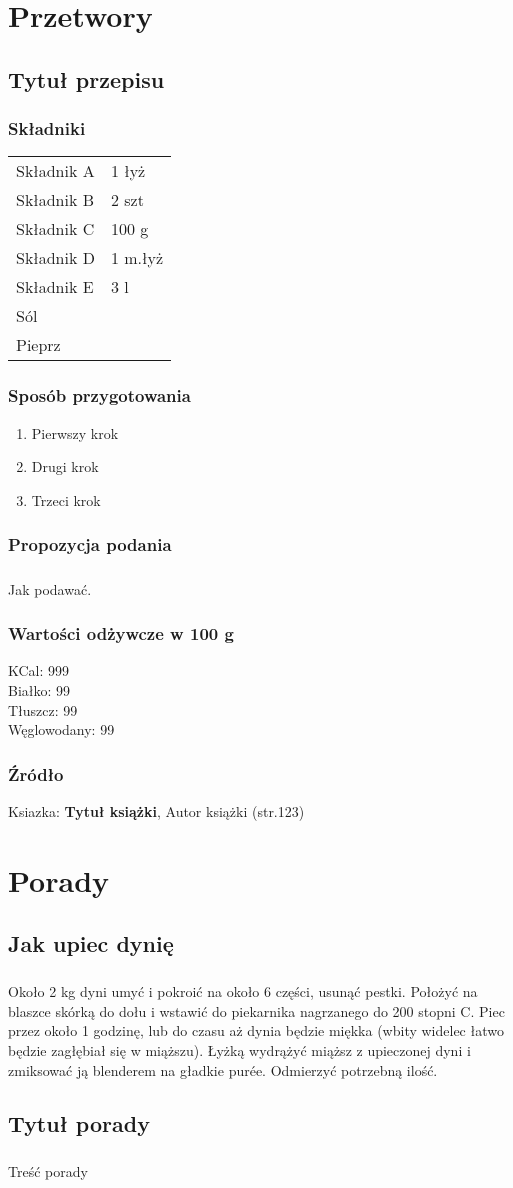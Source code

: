\documentclass{book}
\newcommand{\skladniki}[1]{\subsection*{Składniki}
	\begin{tabular}{ll}
		#1
	\end{tabular}
}
\newcommand{\skladnik}[3]{#3&#1 #2\\}
\newcommand{\sztuk}[2]{\skladnik{#1}{szt}{#2}}
\newcommand{\gram}[2]{\skladnik{#1}{g}{#2}}
\newcommand{\litr}[2]{\skladnik{#1}{l}{#2}}
\newcommand{\lyzka}[2]{\skladnik{#1}{łyż}{#2}}
\newcommand{\lyzeczka}[2]{\skladnik{#1}{m.łyż}{#2}}
\newcommand{\przyprawa}[1]{\skladnik{}{}{#1}}
\newcommand{\przygotowanie}[1]{\subsection*{Sposób przygotowania}
	\begin{enumerate}
		#1
	\end{enumerate}
}
\newcommand{\krok}[1]{\item #1}
\newcommand{\podanie}[1]{\subsection*{Propozycja podania}#1}
\newcommand{\wartosci}[4]{\subsection*{Wartości odżywcze w 100 g}
	KCal: #1\\
	Białko: #2\\
	Tłuszcz: #3\\
	Węglowodany: #4
}
\newcommand{\zrodlo}[1]{\subsection*{Źródło}#1}
\newcommand{\ksiazka}[3]{Ksiazka: \textbf{#1}, #2 (str.#3)}
\begin{document}
	\chapter{Przetwory}
		\newpage
	
		\section{Tytuł przepisu} %
			\skladniki{
				\lyzka{1}{Składnik A}
				\sztuk{2}{Składnik B}
				\gram{100}{Składnik C}
				\lyzeczka{1}{Składnik D}
				\litr{3}{Składnik E}
				\przyprawa{Sól}
				\przyprawa{Pieprz}
			}
			\przygotowanie{
				\krok{Pierwszy krok}
				\krok{Drugi krok}
				\krok{Trzeci krok}
			}
			\podanie{
				\paragraph{}Jak podawać.
			}
			\wartosci{999}{99}{99}{99}
			\zrodlo{\ksiazka{Tytuł książki}{Autor książki}{123}}
			\newpage
	
	\chapter{Porady}
		\newpage
	
		\section{Jak upiec dynię}
			\paragraph{}Około 2 kg dyni umyć i pokroić na około 6 części, usunąć pestki. Położyć na blaszce skórką do dołu i wstawić do piekarnika nagrzanego do 200 stopni C. Piec przez około 1 godzinę, lub do czasu aż dynia będzie miękka (wbity widelec łatwo będzie zagłębiał się w miąższu). Łyżką wydrążyć miąższ z upieczonej dyni i zmiksować ją blenderem na gładkie purée. Odmierzyć potrzebną ilość.
	
		\section{Tytuł porady} %
			\paragraph{}Treść porady
\end{document}
